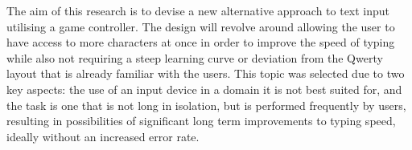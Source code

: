\documentclass[requirements.tex]{subfiles}
\begin{document}
The aim of this research is to devise a new alternative approach to text input
utilising a game controller. The design will revolve around allowing the user
to have access to more characters at once in order to improve the speed of
typing while also not requiring a steep learning curve or deviation from the
Qwerty layout that is already familiar with the users. This topic was selected
due to two key aspects: the use of an input device in a domain it is not best
suited for, and the task is one that is not long in isolation, but is performed
frequently by users, resulting in possibilities of significant long term
improvements to typing speed, ideally without an increased error rate.
\end{document}
